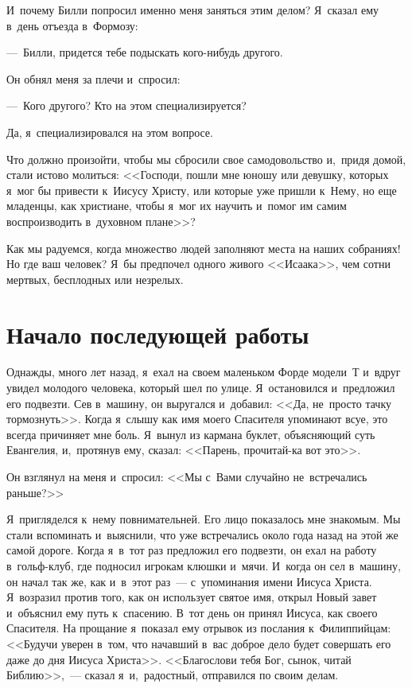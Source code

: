 \documentclass[12pt,article,a4paper,fittopage]{ncc}
\begin{document}
\begin{multicols}{2}
И~почему Билли попросил именно меня заняться этим делом? Я~сказал ему в~день отъезда в~Формозу:

---~Билли, придется тебе подыскать кого-нибудь другого.

Он обнял меня за плечи и~спросил:

---~Кого другого? Кто на этом специализируется? 

Да, я~специализировался на этом вопросе.

\pagestyle{lheadings}

Что должно произойти, чтобы мы сбросили свое самодовольство и,~придя домой, стали истово молиться:  <<Господи, пошли мне юношу или девушку, которых я~мог бы привести к~Иисусу Христу, или которые уже пришли к~Нему, но еще младенцы, как христиане, чтобы я~мог их научить и~помог им самим воспроизводить в~духовном плане>>?

Как мы радуемся, когда множество людей заполняют места на наших собраниях! Но где ваш человек? Я~бы предпочел одного  живого <<Исаака>>, чем сотни мертвых, бесплодных или незрелых.

\section*{Начало последующей работы}

Однажды, много лет назад, я~ехал на своем маленьком Форде модели~Т и~вдруг увидел молодого человека, который шел по улице. Я~остановился и~предложил его подвезти. Сев в~машину, он выругался и~добавил: <<Да, не~просто тачку  тормознуть>>. Когда я~слышу как имя моего Спасителя упоминают всуе, это всегда причиняет мне боль. Я~вынул из кармана буклет, объясняющий суть Евангелия, и,~протянув ему, сказал: <<Парень, прочитай-ка вот это>>.

Он взглянул на меня и~спросил: <<Мы с~Вами случайно не~встречались раньше?>>

Я~пригляделся к~нему повнимательней. Его лицо показалось мне знакомым. Мы стали вспоминать и~выяснили, что уже встречались около года назад на этой же самой дороге. Когда я~в~тот раз предложил его подвезти, он ехал на работу в~гольф-клуб, где подносил игрокам клюшки и~мячи. И~когда он сел в~машину, он начал так же, как и~в~этот раз~--- с~упоминания имени Иисуса Христа. Я~возразил против того, как он использует святое имя, открыл Новый завет и~объяснил ему путь к~спасению. В~тот день он принял Иисуса, как своего Спасителя. На прощание я~показал ему отрывок из послания к~Филиппийцам: <<Будучи уверен в~том, что начавший в~вас доброе дело будет совершать его даже до дня Иисуса Христа>>. <<Благослови тебя Бог, сынок, читай Библию>>,~--- сказал я~и,~радостный, отправился по своим делам.


\end{multicols}
\end{document}
